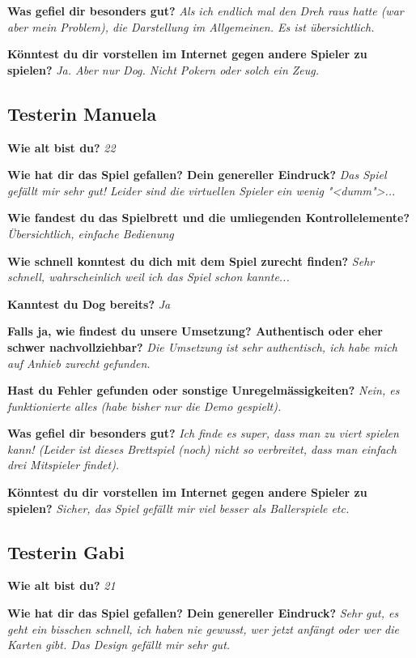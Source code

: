 \documentclass[12pt,halfparskip]{scrartcl}
\begin{document}
\textbf{Was gefiel dir besonders gut?}
\emph{Als ich endlich mal den Dreh raus hatte (war aber mein Problem), die Darstellung im Allgemeinen. Es ist übersichtlich.}

\textbf{Könntest du dir vorstellen im Internet gegen andere Spieler zu spielen?}
\emph{Ja. Aber nur Dog. Nicht Pokern oder solch ein Zeug.}

\subsection{Testerin Manuela}
\textbf{Wie alt bist du?}
\emph{22}

\textbf{Wie hat dir das Spiel gefallen? Dein genereller Eindruck?}
\emph{Das Spiel gefällt mir sehr gut! Leider sind die virtuellen Spieler ein wenig "<dumm">...}

\textbf{Wie fandest du das Spielbrett und die umliegenden Kontrollelemente?}
\emph{Übersichtlich, einfache Bedienung}

\textbf{Wie schnell konntest du dich mit dem Spiel zurecht finden?}
\emph{Sehr schnell, wahrscheinlich weil ich das Spiel schon kannte...}

\textbf{Kanntest du Dog bereits?}
\emph{Ja}

\textbf{Falls ja, wie findest du unsere Umsetzung? Authentisch oder eher schwer nachvollziehbar?}
\emph{Die Umsetzung ist sehr authentisch, ich habe mich auf Anhieb zurecht gefunden.}

\textbf{Hast du Fehler gefunden oder sonstige Unregelmässigkeiten?}
\emph{Nein, es funktionierte alles (habe bisher nur die Demo gespielt).}

\textbf{Was gefiel dir besonders gut?}
\emph{Ich finde es super, dass man zu viert spielen kann! (Leider ist dieses Brettspiel (noch) nicht so verbreitet, dass man einfach drei Mitspieler findet).}

\textbf{Könntest du dir vorstellen im Internet gegen andere Spieler zu spielen?}
\emph{Sicher, das Spiel gefällt mir viel besser als Ballerspiele etc.}

\subsection{Testerin Gabi}
\textbf{Wie alt bist du?}
\emph{21}

\textbf{Wie hat dir das Spiel gefallen? Dein genereller Eindruck?}
\emph{Sehr gut, es geht ein bisschen schnell, ich haben nie gewusst, wer jetzt anfängt oder wer die Karten gibt. Das Design gefällt mir sehr gut.}
\end{document}
